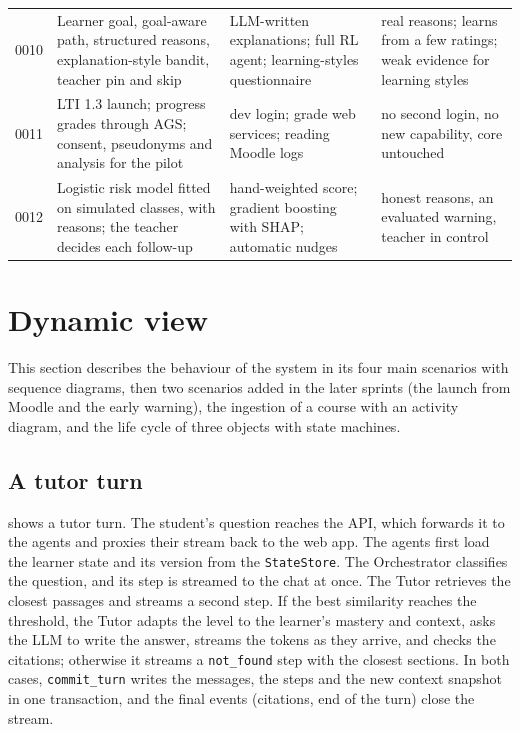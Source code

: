 \begin{table}[htbp]
\begin{tabularx}{\textwidth}{@{}L{0.9cm}YL{3.2cm}L{3.3cm}@{}}
0010 & Learner goal, goal-aware path, structured reasons, explanation-style bandit, teacher pin and skip & LLM-written explanations; full RL agent; learning-styles questionnaire & real reasons; learns from a few ratings; weak evidence for learning styles \\
0011 & LTI 1.3 launch; progress grades through AGS; consent, pseudonyms and analysis for the pilot & dev login; grade web services; reading Moodle logs & no second login, no new capability, core untouched \\
0012 & Logistic risk model fitted on simulated classes, with reasons; the teacher decides each follow-up & hand-weighted score; gradient boosting with SHAP; automatic nudges & honest reasons, an evaluated warning, teacher in control \\
\bottomrule
\end{tabularx}
\end{table}

\section{Dynamic view}
\label{sec-d-dynamic}

This section describes the behaviour of the system in its four main
scenarios with sequence diagrams, then two scenarios added in the later
sprints (the launch from Moodle and the early warning), the ingestion of
a course with an activity diagram, and the life cycle of three objects
with state machines.

\subsection{A tutor turn}

 shows a tutor turn. The student's question reaches
the API, which forwards it to the agents and proxies their stream back to
the web app. The agents first load the learner state and its version
from the \texttt{StateStore}. The Orchestrator classifies the question,
and its step is streamed to the chat at once. The Tutor retrieves the
closest passages and streams a second step. If the best similarity
reaches the threshold, the Tutor adapts the level to the learner's
mastery and context, asks the LLM to write the answer, streams the tokens
as they arrive, and checks the citations; otherwise it streams a
\texttt{not\_found} step with the closest sections. In both cases,
\texttt{commit\_turn} writes the messages, the steps and the new context
snapshot in one transaction, and the final events (citations, end of the
turn) close the stream.

